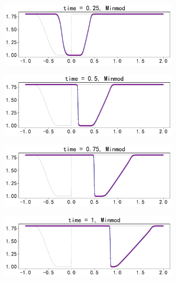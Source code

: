 \documentclass[10.5pt
]{article}
\begin{document}
\begin{figure} 
\centering
\begin{subfigure}{.9\linewidth}
  \includegraphics[width=\textwidth]{figures/problem2_limiter20.25.pdf} %
  \label{fig:problem2-1}
\end{subfigure}
\begin{subfigure}{.9\linewidth}
  \includegraphics[width=\textwidth]{figures/problem2_limiter20.5.pdf} %
  \label{fig:problem2-2}
\end{subfigure}
\begin{subfigure}{.9\linewidth}
  \includegraphics[width=\textwidth]{figures/problem2_limiter20.75.pdf} %
  \label{fig:problem2-3}
\end{subfigure}
\begin{subfigure}{.9\linewidth}
  \includegraphics[width=\textwidth]{figures/problem2_limiter21.pdf} %

\end{subfigure}
\end{figure}
\end{document}
